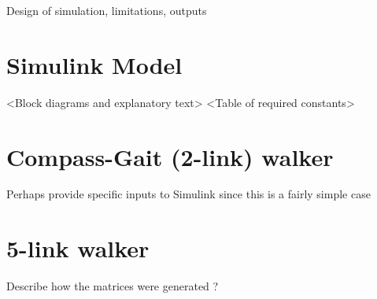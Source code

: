 Design of simulation, limitations, outputs

\section{Simulink Model}
<Block diagrams and explanatory text>
<Table of required constants>

\section{Compass-Gait (2-link) walker}
Perhaps provide specific inputs to Simulink since this is a fairly simple case

\section{5-link walker}
Describe how the matrices were generated \cite{westervelt2007feedback}?